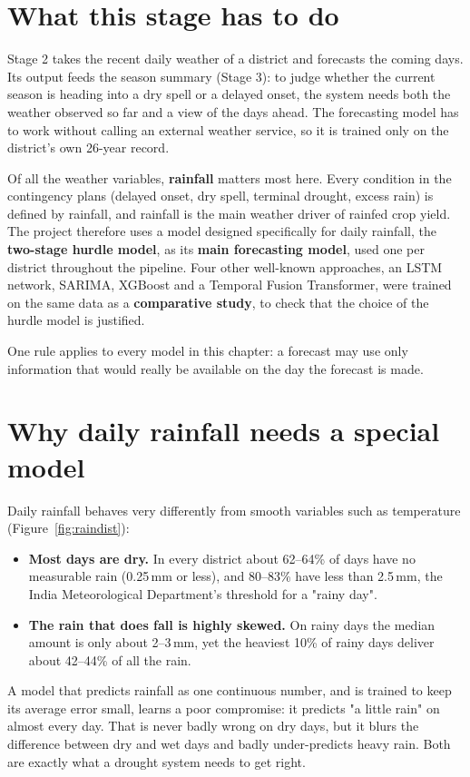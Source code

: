 \label{chap.5}
\section{What this stage has to do}
Stage 2 takes the recent daily weather of a district and forecasts the coming days. Its output feeds the season summary (Stage 3): to judge whether the current season is heading into a dry spell or a delayed onset, the system needs both the weather observed so far and a view of the days ahead. The forecasting model has to work without calling an external weather service, so it is trained only on the district's own 26-year record.

Of all the weather variables, \textbf{rainfall} matters most here. Every condition in the contingency plans (delayed onset, dry spell, terminal drought, excess rain) is defined by rainfall, and rainfall is the main weather driver of rainfed crop yield. The project therefore uses a model designed specifically for daily rainfall, the \textbf{two-stage hurdle model}, as its \textbf{main forecasting model}, used one per district throughout the pipeline. Four other well-known approaches, an LSTM network, SARIMA, XGBoost and a Temporal Fusion Transformer, were trained on the same data as a \textbf{comparative study}, to check that the choice of the hurdle model is justified.

One rule applies to every model in this chapter: a forecast may use only information that would really be available on the day the forecast is made.

\section{Why daily rainfall needs a special model}
Daily rainfall behaves very differently from smooth variables such as temperature (Figure~\ref{fig:raindist}):
\begin{itemize}
	\item \textbf{Most days are dry.} In every district about 62--64\% of days have no measurable rain (0.25\,mm or less), and 80--83\% have less than 2.5\,mm, the India Meteorological Department's threshold for a "rainy day".
	\item \textbf{The rain that does fall is highly skewed.} On rainy days the median amount is only about 2--3\,mm, yet the heaviest 10\% of rainy days deliver about 42--44\% of all the rain.
\end{itemize}
A model that predicts rainfall as one continuous number, and is trained to keep its average error small, learns a poor compromise: it predicts "a little rain" on almost every day. That is never badly wrong on dry days, but it blurs the difference between dry and wet days and badly under-predicts heavy rain. Both are exactly what a drought system needs to get right.

